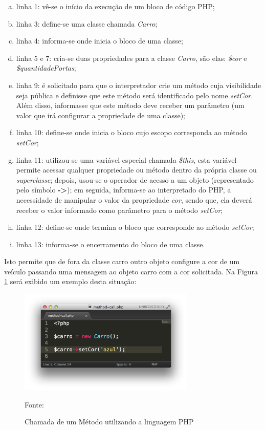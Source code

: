 \begin{enumerate}[a)]
    \item linha 1: vê-se o início da execução de um bloco de código PHP;
    \item linha 3: define-se uma classe chamada \textit{Carro};
    \item linha 4: informa-se onde inicia o bloco de uma classe;
    \item linha 5 e 7: cria-se duas propriedades para a classe
    \textit{Carro}, são elas: \textit{\$cor} e \textit{\$quantidadePortas};
    \item linha 9: é solicitado para que o interpretador crie um método
    cuja visibilidade seja pública e definisse que este método será identificado
    pelo nome \textit{setCor}.
    Além disso, informasse que este método deve receber um parâmetro (um valor
    que  irá configurar a propriedade de uma classe);
    \item linha 10: define-se onde inicia o bloco cujo escopo
    corresponda ao método \textit{setCor};
    \item linha 11: utilizou-se uma variável especial chamada
    \textit{\$this}, esta variável permite acessar qualquer propriedade ou
    método dentro da própria classe ou \textit{superclasse}; depois, usou-se
    o operador de acesso a um objeto (representado pelo símbolo \textbf{->}); em
    seguida, informa-se ao interpretado do \acs{PHP}, a necessidade de manipular
    o valor da propriedade \textit{cor}, sendo que, ela deverá receber o valor
    informado como parâmetro para o método \textit{setCor};
    \item linha 12: define-se onde termina o bloco que corresponde ao
    método \textit{setCor};
    \item linha 13: informa-se o encerramento do bloco de uma classe.
\end{enumerate}

Isto permite que de fora da classe carro outro objeto configure a cor de um
veículo passando uma mensagem ao objeto carro com a cor solicitada. Na Figura
\ref{fig:chamadaMetodo} será exibido um exemplo desta situação:


\begin{figure}[h!tb]
	\caption{Chamada de um Método utilizando a linguagem PHP}
	\label{fig:chamadaMetodo}

	\centering
	\includegraphics[width=0.75\textwidth]{images/method-call.png}

	\centering
	\footnotesize Fonte: \fonteOAutor
\end{figure}

